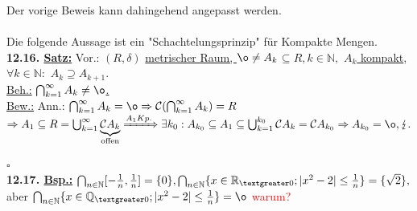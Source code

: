 \documentclass[]{scrartcl}
\newcommand{\redcircle}[1]{%
	\tikz[baseline=(char.base)]{
		\node[shape=circle, draw=red, text=red, thick, inner sep=1pt] (char) 
		{\textbf{#1}};
	}%
}
\begin{document}
	Der vorige Beweis kann dahingehend angepasst werden.\\
	\\
	Die folgende Aussage ist ein "Schachtelungsprinzip" für Kompakte Mengen.\\
	\textbf{12.16. \underline{Satz:}} Vor.: $(R,\delta)$ \ul{metrischer Raum, $\o\neq A_k$}$\subseteq R, k\in \mathbb{N},$ \ul{$A_k$ kompakt},\\
	$\forall k \in \mathbb{N}:$ \ul{$A_k\supseteq A_{k+1}$}.\\
	\underline{Beh.:} \ul{$\bigcap_{k=1}^\infty A_k\neq \o$.}\\
	\underline{Bew.:} Ann.: $\bigcap_{k=1}^\infty A_k=\o \Rightarrow \mathcal{C}(\bigcap_{k=1}^\infty A_k)=R$\\
	$\Rightarrow A_1 \subseteq R = \bigcup_{k=1}^\infty \underbrace{\mathcal{C}A_k}_{\text{offen}}\xRightarrow{A_1 Kp.} \exists k_0: A_{k_0}\subseteq A_1\subseteq \bigcup_{k=1}^{k_0}\mathcal{C} A_k=\mathcal{C}A_{k_0}\\
	\Rightarrow A_{k_0} = \o, \lightning.$\\
	\strut\hfill$\square$\\
	\textbf{12.17. \underline{Bsp.:}} $\bigcap_{n\in\mathbb{N}}[-\frac{1}{n},\frac{1}{n}]=\{0\}, \bigcap_{n\in\mathbb{N}}\{x\in\mathbb{R}_{\textgreater0};|x^2-2|\leq\frac{1}{n}\}=\{\sqrt{2}\},$\\
	aber $\bigcap_{n\in\mathbb{N}}\{x\in\mathbb{Q}_{\textgreater0};|x^2-2|\leq\frac{1}{n}\}=\o$ \redcircle{Ü}\textcolor{red}{warum?}
	
	
	
	
	
	
	
	
	
	
	
	
	
	
	
	
	
	
\end{document}
